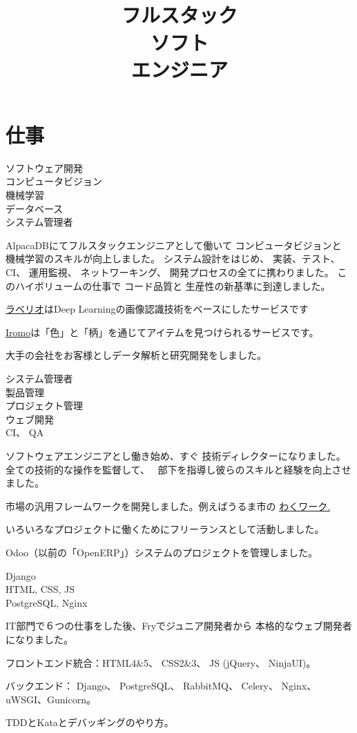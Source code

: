 \documentclass[a4paper,11pt]{cv4tw}%
\title{\\ フルスタック\\ソフト\\エンジニア}
\begin{document}
\section{仕事}
{ソフトウェア開発\\コンピュータビジョン\\ 機械学習\\データベース\\システム管理者}
    {
      AlpacaDBにてフルスタックエンジニアとして働いて コンピュータビジョンと
       機械学習のスキルが向上しました。
       システム設計をはじめ、 実装、テスト、 CI、 運用監視、 ネットワーキング、
       開発プロセスの全てに携わりました。
       このハイボリュームの仕事で コード品質と 生産性の新基準に到達しました。
	\begin{missions}
        \item \underline{\href{http://www.labell.io/}{ラベリオ}}はDeep
            Learningの画像認識技術をベースにしたサービスです
        \item \underline{\href{http://iromo.jp}{Iromo}}は「色」と「柄」を通じてアイテムを見つけられるサービスです。
        \item 大手の会社をお客様としデータ解析と研究開発をしました。
	\end{missions}
}
{システム管理者\\製品管理\\プロジェクト管理\\ウェブ開発\\CI、 QA}
	{ ソフトウェアエンジニアとし働き始め、すぐ
        技術ディレクターになりました。全ての技術的な操作を監督して、　
        部下を指導し彼らのスキルと経験を向上させました。
	\begin{missions}
        \item 市場の汎用フレームワークを開発しました。例えばうるま市の
            \underline{\href{https://uruma-work.com}{わくワーク}.}
        \item いろいろなプロジェクトに働くためにフリーランスとして活動しました。
        \item Odoo（以前の「OpenERP」）システムのプロジェクトを管理しました。
	\end{missions}
}

{Django\\HTML, CSS, JS\\PostgreSQL, Nginx}
	{ IT部門で６つの仕事をした後、Fryでジュニア開発者から 
      本格的なウェブ開発者になりました。
	\begin{missions}
    \item フロントエンド統合：HTML4\&5、 CSS2\&3、 JS (jQuery、 NinjaUI)。
    \item バックエンド： Django、 PostgreSQL、 RabbitMQ、 Celery、 Nginx、
        uWSGI、Gunicorn。
    \item TDDとKataとデバッギングのやり方。
	\end{missions}
}
\end{document}
